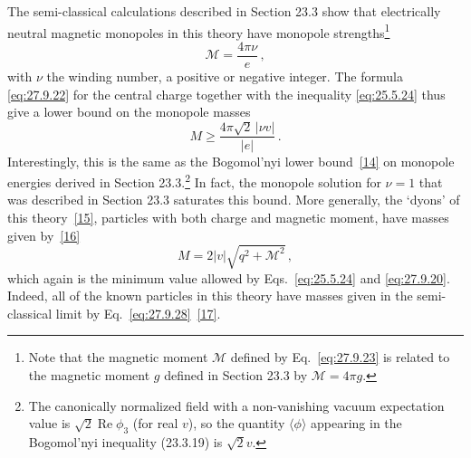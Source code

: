 The semi-classical calculations described in Section 23.3 show that
electrically neutral magnetic monopoles in this theory have monopole
strengths\footnote{Note that the magnetic moment \(\mathcal{M}\) defined by
Eq.~\eqref{eq:27.9.23} is related to the magnetic moment \(g\) defined in
Section 23.3 by \(\mathcal{M}=4\pi g\).}
\begin{equation}
  \mathcal{M}=\frac{4\pi\nu}{e}\,,
  \tag{27.9.26}\label{eq:27.9.26}
\end{equation}
with \(\nu\) the winding number, a positive or negative integer. The formula
\eqref{eq:27.9.22} for the central charge together with the inequality
\eqref{eq:25.5.24} thus give a lower bound on the monopole masses
\begin{equation}
  M\geq\frac{4\pi\sqrt{2}\,|\nu v|}{|e|}\,.
  \tag{27.9.27}\label{eq:27.9.27}
\end{equation}
Interestingly, this is the same as the Bogomol'nyi lower
bound~\hyperref[ch27-ref-14]{[14]} on monopole energies derived in Section
23.3.\footnote{The canonically normalized field with a non-vanishing vacuum
expectation value is \(\sqrt{2}\operatorname{Re}\phi_3\) (for real \(v\)), so
the quantity \(\langle\phi\rangle\) appearing in the Bogomol'nyi inequality
(23.3.19) is \(\sqrt{2}v\).} In fact, the monopole solution for \(\nu=1\)
that was described in Section 23.3 saturates this bound. More generally, the
`dyons' of this theory~\hyperref[ch27-ref-15]{[15]}, particles with both
charge and magnetic moment, have masses given
by~\hyperref[ch27-ref-16]{[16]}
\begin{equation}
  M=2|v|\sqrt{q^2+\mathcal{M}^2}\,,
  \tag{27.9.28}\label{eq:27.9.28}
\end{equation}
which again is the minimum value allowed by Eqs.~\eqref{eq:25.5.24} and
\eqref{eq:27.9.20}. Indeed, all of the known particles in this theory have
masses given in the semi-classical limit by
Eq.~\eqref{eq:27.9.28}~\hyperref[ch27-ref-17]{[17]}.

